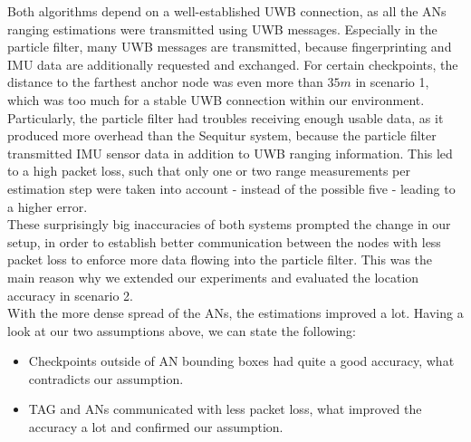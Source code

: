 \noindent\hspace*{5mm}%
Both algorithms depend on a well-established UWB connection, as all the ANs ranging estimations were transmitted using UWB messages. Especially in the particle filter, many UWB messages are transmitted, because fingerprinting and IMU data are additionally requested and exchanged. For certain checkpoints, the distance to the farthest anchor node was even more than $35m$ in scenario 1, which was too much for a stable UWB connection within our environment. Particularly, the particle filter had troubles receiving enough usable data, as it produced more overhead than the Sequitur system, because the particle filter transmitted IMU sensor data in addition to UWB ranging information. This led to a high packet loss, such that only one or two range measurements per estimation step were taken into account - instead of the possible five - leading to a higher error. \\
\noindent\hspace*{5mm}%
These surprisingly big inaccuracies of both systems prompted the change in our setup, in order to establish better communication between the nodes with less packet loss to enforce more data flowing into the particle filter. This was the main reason why we extended our experiments and evaluated the location accuracy in scenario 2.\\
\noindent\hspace*{5mm}%
With the more dense spread of the ANs, the estimations improved a lot. Having a look at our two assumptions above, we can state the following:

\begin{itemize}
\item Checkpoints outside of AN bounding boxes had quite a good accuracy, what contradicts our assumption.
\item TAG and ANs communicated with less packet loss, what improved the accuracy a lot and confirmed our assumption.
\end{itemize}

